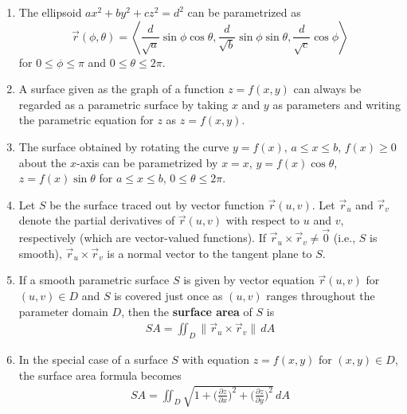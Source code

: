 \documentclass[10pt]{article}
\begin{document}
\begin{multicols}{2}
\begin{enumerate}
\begin{enumerate}
        \item The ellipsoid $ax^2 + by^2 + cz^2 = d^2$ can be parametrized as $$\vec{r}(\phi, \theta) = \left< \frac{d}{\sqrt{a}}\sin{\phi}\cos{\theta}, \frac{d}{\sqrt{b}}\sin{\phi}\sin{\theta}, \frac{d}{\sqrt{c}}\cos{\phi} \right>$$ for $0 \leq \phi \leq \pi$ and $0 \leq \theta \leq 2\pi$.
        \item A surface given as the graph of a function $z=f(x,y)$ can always be regarded as a parametric surface by taking $x$ and $y$ as parameters and writing the parametric equation for $z$ as $z=f(x,y)$.
        \item The surface obtained by rotating the curve $y=f(x)$, $a \leq x \leq b$, $f(x) \geq 0$ about the $x$-axis can be parametrized by $x=x$, $y=f(x)\cos{\theta}$, $z=f(x)\sin{\theta}$ for $a \leq x \leq b$, $0 \leq \theta \leq 2\pi$.
        \item Let $S$ be the surface traced out by vector function $\vec{r}(u,v)$. Let $\vec{r}_u$ and $\vec{r}_v$ denote the partial derivatives of $\vec{r}(u,v)$ with respect to $u$ and $v$, respectively (which are vector-valued functions). If $\vec{r}_u \times \vec{r}_v \neq \vec{0}$ (i.e., $S$ is smooth), $\vec{r}_u \times \vec{r}_v$ is a normal vector to the tangent plane to $S$.
        \item If a smooth parametric surface $S$ is given by vector equation $\vec{r}(u,v)$ for $(u,v) \in D$ and $S$ is covered just once as $(u,v)$ ranges throughout the parameter domain $D$, then the \textbf{surface area} of $S$ is
        \begin{align*}
            SA = \iint_D \| \vec{r}_u \times \vec{r}_v \| \,dA
        \end{align*}
        \item In the special case of a surface $S$ with equation $z=f(x,y)$ for $(x,y) \in D$, the surface area formula becomes
        \begin{align*}
            SA = \iint_D \sqrt{1 + \biggl( \frac{\partial z}{\partial x} \biggr)^2 + \biggl( \frac{\partial z}{\partial y} \biggr)^2} \,dA
        \end{align*}
    \end{enumerate}
    

\end{enumerate}
\end{multicols}
\end{document}
